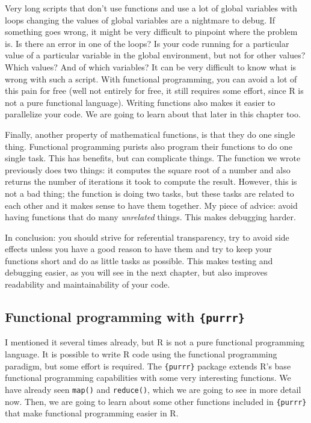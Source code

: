\documentclass[
]{article}
\begin{document}
Very long scripts that don't use functions and use a lot of global variables with loops changing
the values of global variables are a nightmare to debug. If something goes wrong, it might be very
difficult to pinpoint where the problem is. Is there an error in one of the loops?
Is your code running for a particular value of a particular variable in the global environment, but
not for other values? Which values? And of which variables? It can be very difficult to know what
is wrong with such a script.
With functional programming, you can avoid a lot of this pain for free (well not entirely for free,
it still requires some effort, since R is not a pure functional language). Writing functions also
makes it easier to parallelize your code. We are going to learn about that later in this chapter too.

Finally, another property of mathematical functions, is that they do one single thing. Functional
programming purists also program their functions to do one single task. This has benefits, but
can complicate things. The function we wrote previously does two things: it computes the square
root of a number and also returns the number of iterations it took to compute the result. However,
this is not a bad thing; the function is doing two tasks, but these tasks are related to each other
and it makes sense to have them together. My piece of advice: avoid having functions that do
many \emph{unrelated} things. This makes debugging harder.

In conclusion: you should strive for referential transparency, try to avoid side effects unless you
have a good reason to have them and try to keep your functions short and do as little tasks as
possible. This makes testing and debugging easier, as you will see in the next chapter, but also
improves readability and maintainability of your code.

\hypertarget{functional-programming-with-purrr}{%
\subsection{\texorpdfstring{Functional programming with \texttt{\{purrr\}}}{Functional programming with \{purrr\}}}\label{functional-programming-with-purrr}}

I mentioned it several times already, but R is not a pure functional programming language. It is
possible to write R code using the functional programming paradigm, but some effort is required.
The \texttt{\{purrr\}} package extends R's base functional programming capabilities with some very interesting
functions. We have already seen \texttt{map()} and \texttt{reduce()}, which we are going to see in more detail now.
Then, we are going to learn about some other functions included in \texttt{\{purrr\}} that make functional
programming easier in R.
\end{document}
